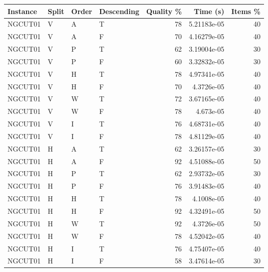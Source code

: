 \begin{tabular}{llllrrr}
    \hline
    Instance & Split & Order & Descending & Quality \% & Time (s)    & Items \% \\
    \hline
    NGCUT01  & V     & A     & T          & 78         & 5.21183e-05 & 40       \\
    NGCUT01  & V     & A     & F          & 70         & 4.16279e-05 & 40       \\
    NGCUT01  & V     & P     & T          & 62         & 3.19004e-05 & 30       \\
    NGCUT01  & V     & P     & F          & 60         & 3.32832e-05 & 30       \\
    NGCUT01  & V     & H     & T          & 78         & 4.97341e-05 & 40       \\
    NGCUT01  & V     & H     & F          & 70         & 4.3726e-05  & 40       \\
    NGCUT01  & V     & W     & T          & 72         & 3.67165e-05 & 40       \\
    NGCUT01  & V     & W     & F          & 78         & 4.673e-05   & 40       \\
    NGCUT01  & V     & I     & T          & 76         & 4.68731e-05 & 40       \\
    NGCUT01  & V     & I     & F          & 78         & 4.81129e-05 & 40       \\
    NGCUT01  & H     & A     & T          & 62         & 3.26157e-05 & 30       \\
    NGCUT01  & H     & A     & F          & 92         & 4.51088e-05 & 50       \\
    NGCUT01  & H     & P     & T          & 62         & 2.93732e-05 & 30       \\
    NGCUT01  & H     & P     & F          & 76         & 3.91483e-05 & 40       \\
    NGCUT01  & H     & H     & T          & 78         & 4.1008e-05  & 40       \\
    NGCUT01  & H     & H     & F          & 92         & 4.32491e-05 & 50       \\
    NGCUT01  & H     & W     & T          & 92         & 4.3726e-05  & 50       \\
    NGCUT01  & H     & W     & F          & 78         & 4.52042e-05 & 40       \\
    NGCUT01  & H     & I     & T          & 76         & 4.75407e-05 & 40       \\
    NGCUT01  & H     & I     & F          & 58         & 3.47614e-05 & 30       \\

\end{tabular}
